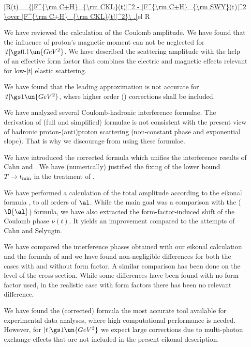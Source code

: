 \eqref{R(t) = {|F^{\rm C+H}_{\rm CKL}(t)|^2 - |F^{\rm C+H}_{\rm SWY}(t)|^2 \over |F^{\rm C+H}_{\rm CKL}(t)|^2}\ .}{el R}



We have reviewed the calculation of the Coulomb amplitude. We have found that the influence of proton's magnetic moment can not be neglected for $|t| \gs 0.1\un{GeV^2}$. We have described the scattering amplitude with the help of an effective form factor that combines the electric and magnetic effects relevant for low-$|t|$ elastic scattering.

We have found that the leading  approximation is not accurate for $|t| \gs 1\un{GeV^2}$, where higher order () corrections shall be included.

We have analyzed several Coulomb-hadronic interference formulae. The derivation of (full and simplified) \WaY{} formulae is not consistent with the present view of hadronic proton-(anti)proton scattering (non-constant phase and exponential slope). That is why we discourage from using these formulae.

We have introduced the corrected \KaL{} formula which unifies the interference results of Cahn and \KaL. We have (numerically) justified the fixing of the lower bound $T\to t_{\rm min}$ in the treatment of \KaL{}.

We have performed a calculation of the total amplitude according to the eikonal formula , to all orders of $\al$. While the main goal was a comparison with the ($\O{\al}$) \KaL{} formula, we have also extracted the form-factor-induced shift of the Coulomb phase $\nu(t)$. It yields an improvement compared to the attempts of Cahn and Selyugin.

We have compared the interference phases obtained with our eikonal calculation and the formula of \KaL{} and we have found non-negligible differences for both the cases with and without form factor. A similar comparison has been done on the level of the cross-section. While some differences have been found with no form factor used, in the realistic case with form factors there has been no relevant difference.

We have found the (corrected) \KaL{} formula the most accurate tool available for experimental data analyses, where high computational performance is needed. However, for $|t| \gs 1\un{GeV^2}$ we expect large corrections due to multi-photon exchange effects that are not included in the present eikonal description.
